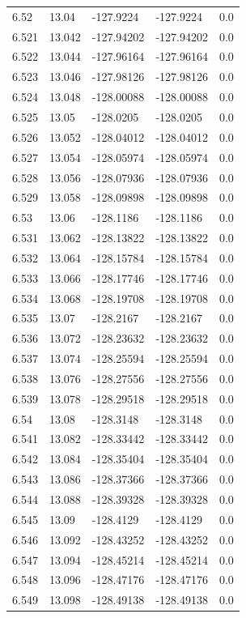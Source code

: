 \begin{tabular}{lllll}
6.52 & 13.04 & -127.9224 & -127.9224 & 0.0 \\
6.521 & 13.042 & -127.94202 & -127.94202 & 0.0 \\
6.522 & 13.044 & -127.96164 & -127.96164 & 0.0 \\
6.523 & 13.046 & -127.98126 & -127.98126 & 0.0 \\
6.524 & 13.048 & -128.00088 & -128.00088 & 0.0 \\
6.525 & 13.05 & -128.0205 & -128.0205 & 0.0 \\
6.526 & 13.052 & -128.04012 & -128.04012 & 0.0 \\
6.527 & 13.054 & -128.05974 & -128.05974 & 0.0 \\
6.528 & 13.056 & -128.07936 & -128.07936 & 0.0 \\
6.529 & 13.058 & -128.09898 & -128.09898 & 0.0 \\
6.53 & 13.06 & -128.1186 & -128.1186 & 0.0 \\
6.531 & 13.062 & -128.13822 & -128.13822 & 0.0 \\
6.532 & 13.064 & -128.15784 & -128.15784 & 0.0 \\
6.533 & 13.066 & -128.17746 & -128.17746 & 0.0 \\
6.534 & 13.068 & -128.19708 & -128.19708 & 0.0 \\
6.535 & 13.07 & -128.2167 & -128.2167 & 0.0 \\
6.536 & 13.072 & -128.23632 & -128.23632 & 0.0 \\
6.537 & 13.074 & -128.25594 & -128.25594 & 0.0 \\
6.538 & 13.076 & -128.27556 & -128.27556 & 0.0 \\
6.539 & 13.078 & -128.29518 & -128.29518 & 0.0 \\
6.54 & 13.08 & -128.3148 & -128.3148 & 0.0 \\
6.541 & 13.082 & -128.33442 & -128.33442 & 0.0 \\
6.542 & 13.084 & -128.35404 & -128.35404 & 0.0 \\
6.543 & 13.086 & -128.37366 & -128.37366 & 0.0 \\
6.544 & 13.088 & -128.39328 & -128.39328 & 0.0 \\
6.545 & 13.09 & -128.4129 & -128.4129 & 0.0 \\
6.546 & 13.092 & -128.43252 & -128.43252 & 0.0 \\
6.547 & 13.094 & -128.45214 & -128.45214 & 0.0 \\
6.548 & 13.096 & -128.47176 & -128.47176 & 0.0 \\
6.549 & 13.098 & -128.49138 & -128.49138 & 0.0 \\

\end{tabular}
